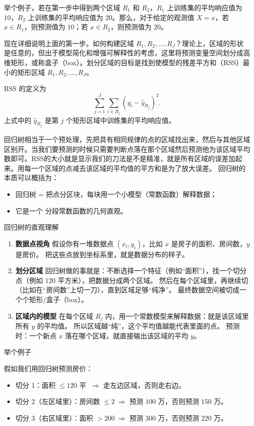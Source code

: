 举个例子，若在第一步中得到两个区域 $R_1$ 和 $R_2$，$R_1$ 上训练集的平均响应值为 $10$，$R_2$ 上训练集的平均响应值为 $20$。那么，对于给定的观测值 $X = x$，若 $x \in R_1$，则预测值为 $10$；若 $x \in R_2$，则预测值为 $20$。

现在详细说明上面的第一步。如何构建区域 $R_1, R_2, \dots, R_J$？理论上，区域的形状是任意的，但出于模型简化和增强可解释性的考虑，这里将预测变量空间划分成高维矩形，或称盒子（box）。划分区域的目标是找到使模型的残差平方和（RSS）最小的矩形区域 $R_1, R_2, \dots, R_J$。

RSS 的定义为
\[
\sum_{j=1}^J \sum_{i \in R_j} (y_i - \hat{y}_{R_j})^2.
\]
上式中的 $\hat{y}_{R_j}$ 是第 $j$ 个矩形区域中训练集的平均响应值。
\begin{dxtips}[回归树的原理]
回归树相当于一个预处理，先把具有相同规律的点的区域找出来，然后与其他区域区别开。当我们要预测的时候只需要判断点落在那个区域然后预测他为该区域平均数即可。RSS的大小就是显示我们的刀法是不是精准，就是所有区域的误差加起来。用每一个区域的点减去该区域的平均值的平方和是为了放大误差。
回归树的本质可以概括为：
\begin{itemize}
  \item 回归树 = 把点分区块，每块用一个小模型（常数函数）解释数据；
  \item 它是一个 分段常数函数的几何直观。
\end{itemize}
\end{dxtips}

回归树的直观理解

\begin{enumerate}
  \item \textbf{数据点视角}  
  假设你有一堆数据点 $(x_i, y_i)$，比如 $x$ 是房子的面积、房间数，$y$ 是房价。  
  把这些点放到坐标系里，就是数据分布的样子。

  \item \textbf{划分区域}  
  回归树做的事就是：不断选择一个特征（例如“面积”），找一个切分点（例如 $120$ 平方米），把数据分成两个区域。  
  然后在每个区域里，再继续切（比如在“房间数”上切一刀），直到区域足够“纯净”。  
  最终数据空间被切成一个个矩形/盒子（box）。

  \item \textbf{区域内的模型}  
  在每个区域 $R_j$ 内，用一个常数模型来解释数据：就是该区域里所有 $y$ 的平均值。  
  所以区域越“纯”，这个平均值越能代表里面的点。  
  预测时：一个新点 $x$ 落在哪个区域，就直接输出该区域的平均 $y$。
\end{enumerate}

举个例子

假如我们用回归树预测房价：
\begin{itemize}
  \item 切分 1：面积 $\leq 120$ 平 $\;\Rightarrow$ 走左边区域，否则走右边。
  \item 切分 2（左区域里）：房间数 $\leq 2 \;\Rightarrow$ 预测 $100$ 万，否则预测 $150$ 万。
  \item 切分 3（右区域里）：面积 $> 200 \;\Rightarrow$ 预测 $300$ 万，否则预测 $220$ 万。
\end{itemize}

